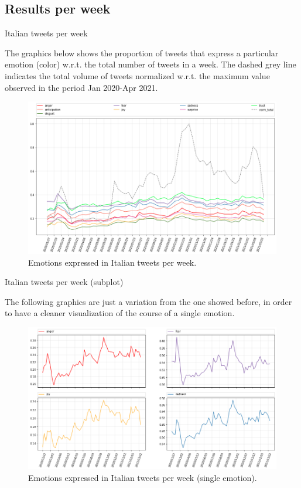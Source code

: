 \documentclass[8pt]{beamer}  %
\begin{document}
\subsection{Results per week}
\begin{frame}{Italian tweets per week}
	
	The graphics below shows the proportion of tweets that express a particular emotion (color) w.r.t. the total number of tweets in a week. The dashed grey line indicates the total volume of tweets normalized w.r.t. the maximum value observed in the period Jan 2020-Apr 2021.
	
	\begin{figure}[h]
    	\includegraphics[scale=.29]{assets/img/it_emotions.png}
    	\caption{Emotions expressed in Italian tweets per week.}
    	\label{fig:it_emotion_weekly}
    \end{figure}

\end{frame}


\begin{frame}{Italian tweets per week (subplot)}
	
	The following graphics are just a variation from the one showed before, in order to have a cleaner visualization of the course of a single emotion. 
	
	\begin{figure}[h]
    	\includegraphics[scale=.3]{assets/img/it_emotions_subplots.png}
    	\caption{Emotions expressed in Italian tweets per week (single emotion).}
    	\label{fig:it_emotion_weekly_subplot}
    \end{figure}

\end{frame}
\end{document}
